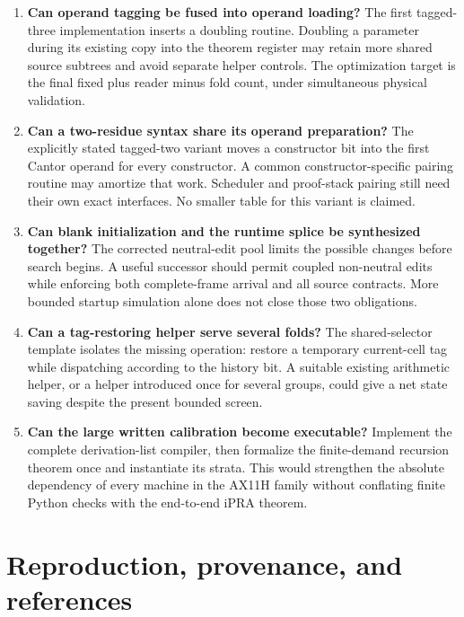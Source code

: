 \documentclass[11pt,letterpaper]{article}
\begin{document}
\begin{enumerate}
\item \textbf{Can operand tagging be fused into operand loading?}
      The first tagged-three implementation inserts a doubling routine.
      Doubling a parameter during its existing copy into the theorem
      register may retain more shared source subtrees and avoid separate
      helper controls. The optimization target is the final fixed plus
      reader minus fold count, under simultaneous physical validation.
\item \textbf{Can a two-residue syntax share its operand preparation?}
      The explicitly stated tagged-two variant moves a constructor bit
      into the first Cantor operand for every constructor. A common
      constructor-specific pairing routine may amortize that work.
      Scheduler and proof-stack pairing still need their own exact
      interfaces. No smaller table for this variant is claimed.
\item \textbf{Can blank initialization and the runtime splice be
      synthesized together?} The corrected neutral-edit pool limits
      the possible changes before search begins. A useful successor
      should permit coupled non-neutral edits while enforcing both
      complete-frame arrival and all source contracts. More bounded
      startup simulation alone does not close those two obligations.
\item \textbf{Can a tag-restoring helper serve several folds?}
      The shared-selector template isolates the missing operation:
      restore a temporary current-cell tag while dispatching according
      to the history bit. A suitable existing arithmetic helper, or a
      helper introduced once for several groups, could give a net state
      saving despite the present bounded screen.
\item \textbf{Can the large written calibration become executable?}
      Implement the complete derivation-list compiler, then formalize
      the finite-demand recursion theorem once and instantiate its
      strata. This would strengthen the absolute dependency of every
      machine in the AX11H family without conflating finite Python
      checks with the end-to-end iPRA theorem.
\end{enumerate}

\section{Reproduction, provenance, and references}
\end{document}
